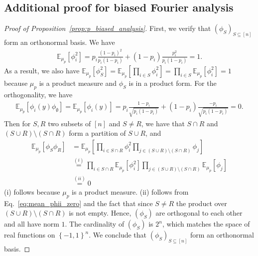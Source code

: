 \documentclass[11pt]{article}
\theoremstyle{named}
\theoremstyle{plain}
\newcommand{\Exs}{\ensuremath{{\mathbb{E}}}}
\newcommand{\brackets}[1]{\left[ #1 \right]}
\newcommand{\braces}[1]{\left\{ #1 \right \}}
\begin{document}
\subsection{Additional proof for biased Fourier analysis}
\begin{proof}[Proof of Proposition~\ref{prop:p_biased_analysis}]\label{proof:proof_of_prop1}
  First, we verify that $(\phi_S)_{S \subseteq [n]}$ form an orthonormal basis. We have
  \begin{align*}
    \Exs_{\mu_p}[\phi_i^2] = p_i \frac{(1-p_i)^2}{p_i(1-p_i)} + (1-p_i) \frac{p_i^2}{p_i(1-p_i)} = 1. 
  \end{align*}
  As a result, we also have $\Exs_{\mu_p}[\phi_S^2] = \Exs_{\mu_p} [\prod_{i\in S} \phi_i^2] = \prod_{i\in S} \Exs_{\mu_p} [\phi_i^2] = 1$ because $\mu_p$ is a product measure and $\phi_S$ is in a product form. For the orthogonality, we have
  \begin{align}
    \label{eq:mean_phii_zero}
    \Exs_{\mu_p}\brackets{\phi_i(y) \phi_{\emptyset}} =  \Exs_{\mu_p}\brackets{\phi_i(y)} = p_i \frac{1-p_i}{\sqrt{p_i(1-p_i)}} + (1-p_i) \frac{-p_i}{\sqrt{p_i (1-p_i)}} = 0.
  \end{align}
  Then for $S, R$ two subsets of $[n]$ and $S \neq R$, we have that $S\cap R$ and $(S \cup R) \setminus (S\cap R)$ form a partition of $S \cup R$, and
  \begin{align*}
    \Exs_{\mu_p}[\phi_S \phi_R] &= \Exs_{\mu_p}\brackets{\prod_{i \in S \cap R} \phi_i^2  \prod_{j \in (S \cup R) \setminus (S\cap R)} \phi_j  }\\
    &\overset{(i)}{=} \prod_{i \in S \cap R} \Exs_{\mu_p}\brackets{\phi_i^2} \prod_{j \in (S \cup R) \setminus (S\cap R)} \Exs_{\mu_p} \brackets{ \phi_j} \\
    &\overset{(ii)}{=} 0
  \end{align*}
  (i) follows because $\mu_p$ is a product measure. (ii) follows from Eq.~\eqref{eq:mean_phii_zero} and the fact that since $S \neq R$ the product over $(S \cup R) \setminus (S\cap R)$ is not empty. Hence, $(\phi_S)$ are orthogonal to each other and all have norm $1$. The cardinality of $(\phi_S)$ is $2^n$, which matches the space of real functions on $\braces{-1, 1}^n$. We conclude that $(\phi_S)_{S\subseteq [n]}$ form an orthonormal basis. 


\end{proof}
\end{document}
